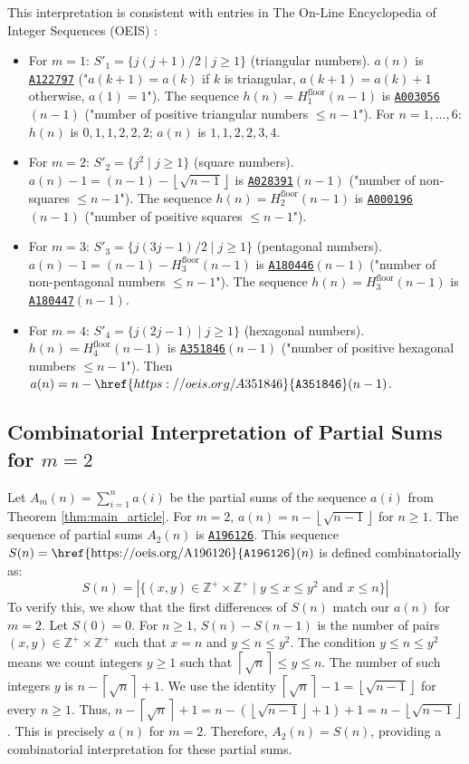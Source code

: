 \documentclass[11pt,a4paper]{article} %
\theoremstyle{remark}
\newcommand{\Zplus}{\mathbb{Z}^+} %
\newcommand{\floor}[1]{\left\lfloor #1 \right\rfloor} %
\newcommand{\ceil}[1]{\left\lceil #1 \right\rceil} %
\newcommand{\oeislink}[1]{\href{https://oeis.org/#1}{\texttt{#1}}}
\begin{document}
This interpretation is consistent with entries in The On-Line Encyclopedia of Integer Sequences (OEIS) \cite{OEIS}:
\begin{itemize}
    \item For $m=1$: $S'_1 = \{j(j+1)/2 \mid j \ge 1\}$ (triangular numbers). $a(n)$ is \oeislink{A122797} ("$a(k+1)=a(k)$ if $k$ is triangular, $a(k+1)=a(k)+1$ otherwise, $a(1)=1$"). The sequence $h(n)=H_1^{\text{floor}}(n-1)$ is \oeislink{A003056}$(n-1)$ ("number of positive triangular numbers $\le n-1$"). For $n=1, \dots, 6$: $h(n)$ is $0,1,1,2,2,2$; $a(n)$ is $1,1,2,2,3,4$.
    \item For $m=2$: $S'_2 = \{j^2 \mid j \ge 1\}$ (square numbers). $a(n)-1 = (n-1) - \floor{\sqrt{n-1}}$ is \oeislink{A028391}$(n-1)$ ("number of non-squares $\le n-1$"). The sequence $h(n)=H_2^{\text{floor}}(n-1)$ is \oeislink{A000196}$(n-1)$ ("number of positive squares $\le n-1$").
    \item For $m=3$: $S'_3 = \{j(3j-1)/2 \mid j \ge 1\}$ (pentagonal numbers). $a(n)-1 = (n-1) - H_3^{\text{floor}}(n-1)$ is \oeislink{A180446}$(n-1)$ ("number of non-pentagonal numbers $\le n-1$"). The sequence $h(n)=H_3^{\text{floor}}(n-1)$ is \oeislink{A180447}$(n-1)$.
    \item For $m=4$: $S'_4 = \{j(2j-1) \mid j \ge 1\}$ (hexagonal numbers). $h(n)=H_4^{\text{floor}}(n-1)$ is \oeislink{A351846}$(n-1)$ ("number of positive hexagonal numbers $\le n-1$"). Then $a(n)=n-\oeislink{A351846}(n-1)$.
\end{itemize}

\subsection{Combinatorial Interpretation of Partial Sums for $m=2$}
Let $A_m(n) = \sum_{i=1}^n a(i)$ be the partial sums of the sequence $a(i)$ from Theorem \ref{thm:main_article}.
For $m=2$, $a(n) = n - \floor{\sqrt{n-1}}$ for $n \ge 1$.
The sequence of partial sums $A_2(n)$ is \oeislink{A196126}.
This sequence $S(n) = \text{\oeislink{A196126}}(n)$ is defined combinatorially as:
$$S(n) = |\{(x,y) \in \Zplus \times \Zplus \mid y \le x \le y^2 \text{ and } x \le n\}|$$
To verify this, we show that the first differences of $S(n)$ match our $a(n)$ for $m=2$. Let $S(0)=0$.
For $n \ge 1$, $S(n)-S(n-1)$ is the number of pairs $(x,y) \in \Zplus \times \Zplus$ such that $x=n$ and $y \le n \le y^2$.
The condition $y \le n \le y^2$ means we count integers $y \ge 1$ such that $\ceil{\sqrt{n}} \le y \le n$.
The number of such integers $y$ is $n - \ceil{\sqrt{n}} + 1$.
We use the identity $\ceil{\sqrt{n}} - 1 = \floor{\sqrt{n-1}}$ for every $n \ge 1$.
Thus, $n - \ceil{\sqrt{n}} + 1 = n - (\floor{\sqrt{n-1}} + 1) + 1 = n - \floor{\sqrt{n-1}}$.
This is precisely $a(n)$ for $m=2$.
Therefore, $A_2(n)=S(n)$, providing a combinatorial interpretation for these partial sums.
\end{document}
